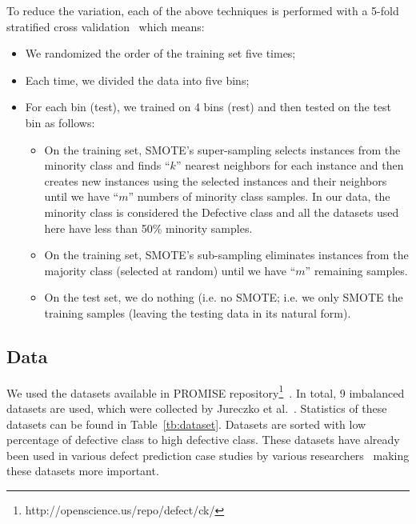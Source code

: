 \documentclass[10pt,conference]{IEEEtran}
\newcommand{\bi}{\begin{itemize}[leftmargin=0.4cm]}
\newcommand{\ei}{\end{itemize}}
\theoremstyle{break}
\theoremstyle{break}
\begin{document}
To reduce the variation, each of the above techniques is performed with a 5-fold stratified cross validation~\cite{refaeilzadeh2009cross} which means:
\bi
\item We randomized the order of the training set five times;
\item Each time, we divided the data into five bins;
\item For each bin (test), we trained on 4 bins (rest) and then tested
on the test bin as follows:
\bi
\item
On the training set, SMOTE's super-sampling selects instances from the minority class and finds ``$k$'' nearest neighbors for each instance and then creates new instances using the selected instances and their neighbors until we have ``$m$'' numbers of minority class samples. 
In our data, 
 the minority class is considered the Defective class and all the datasets used here have less than 50\% minority samples.
\item
On the training set, SMOTE's sub-sampling  eliminates instances from the majority class (selected at random)
until we have ``$m$'' remaining samples.
 
\item On the test set, we do nothing (i.e. no SMOTE;
i.e. we only SMOTE the training samples
(leaving the  testing data in its natural form).
\ei
\ei

\subsection{\textbf{Data}}
 We used the datasets available in PROMISE repository\footnote{http://openscience.us/repo/defect/ck/}~\cite{promiserepo}. In total, 9 imbalanced datasets are used, which were collected by Jureczko et al.~\cite{jureczko2010towards}. Statistics of these datasets can be found in Table~\ref{tb:dataset}. Datasets are sorted with low percentage of defective class to high defective class. These datasets have already been used in various defect prediction case studies by various researchers~\cite{he2012investigation,peters2013better,peters2013balancing,turhan2013empirical} making these datasets more important.
 
\end{document}
